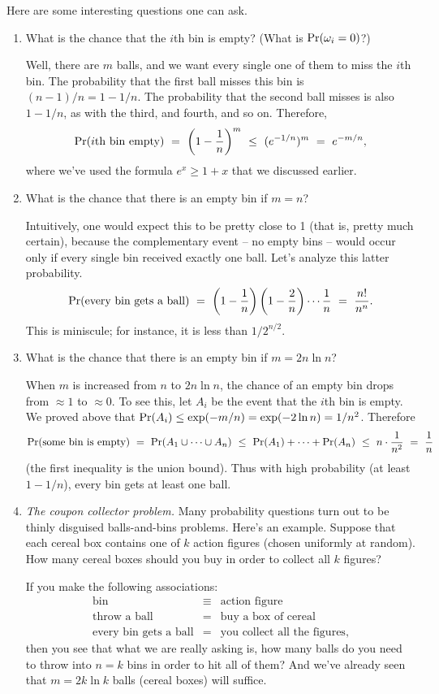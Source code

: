 \documentclass{report}
\theoremstyle{plain}
\theoremstyle{definition}
\newcommand{\pr}{\mbox{\rm Pr}}
\begin{document}
Here are some interesting questions one can ask.
\begin{enumerate}
\item What is the chance that the $i$th bin is empty? (What is $\pr(\omega_i = 0)$?)

Well, there are $m$ balls, and we want every single one of them to miss the $i$th bin. The probability that the first ball misses this bin is $(n-1)/n = 1 - 1/n$. The probability that the second ball misses is also $1- 1/n$, as with the third, and fourth, and so on. Therefore,
$$ \pr(\mbox{$i$th bin empty}) 
\ = \ 
\left( 1 - \frac{1}{n} \right)^m
\ \leq \ 
(e^{-1/n})^m 
\ = \ 
e^{-m/n},
$$
where we've used the formula $e^x \geq 1+x$ that we discussed earlier.

\item What is the chance that there is an empty bin if $m = n$?

Intuitively, one would expect this to be pretty close to 1 (that is, pretty much certain), because the complementary event -- no empty bins -- would occur only if every single bin received exactly one ball. Let's analyze this latter probability.
$$
\pr(\mbox{every bin gets a ball}) 
\ = \ 
\left(1 - \frac{1}{n}\right) \left( 1- \frac{2}{n}\right) \cdots \frac{1}{n} 
\ = \ 
\frac{n!}{n^n}.
$$
This is miniscule; for instance, it is less than $1/2^{n/2}$.

\item What is the chance that there is an empty bin if $m = 2n\ln n$?

When $m$ is increased from $n$ to $2n \ln n$, the chance of an empty bin drops from $\approx 1$ to $\approx 0$. To see this, let $A_i$ be the event that the $i$th bin is empty. We proved above that $\pr(A_i) \leq \exp(-m/n) = \exp(-2\ln n) = 1/n^2$. Therefore
$$
\pr(\mbox{some bin is empty}) 
\ = \ 
\pr(A_1 \cup \cdots \cup A_n) 
\ \leq \ 
\pr(A_1) + \cdots + \pr(A_n)
\ \leq \ 
n \cdot \frac{1}{n^2}
\ = \ 
\frac{1}{n}
$$
(the first inequality is the union bound). Thus with high probability (at least $1-1/n$), every bin gets at least one ball.

\item {\it The coupon collector problem.} Many probability questions turn out to be thinly disguised balls-and-bins problems. Here's an example. Suppose that each cereal box contains one of $k$ action figures (chosen uniformly at random). How many cereal boxes should you buy in order to collect all $k$ figures?

If you make the following associations:
\begin{eqnarray*}
\mbox{bin} & \equiv & \mbox{action figure} \\
\mbox{throw a ball} & = & \mbox{buy a box of cereal} \\
\mbox{every bin gets a ball} & = & \mbox{you collect all the figures},
\end{eqnarray*}
then you see that what we are really asking is, how many balls do you need to throw into $n = k$ bins in order to hit all of them? And we've already seen that $m = 2k\ln k$ balls (cereal boxes) will suffice.


\end{enumerate}
\end{document}
